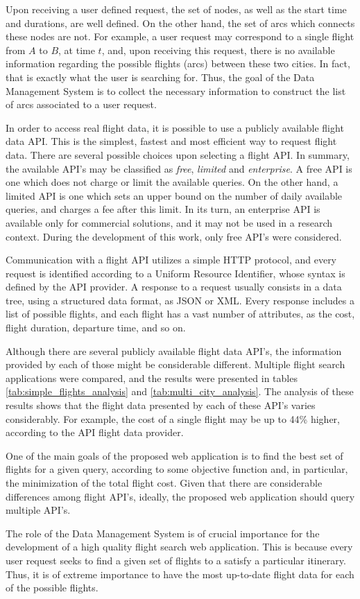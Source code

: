 Upon receiving a user defined request, the set of nodes, as well as the start time and durations, are well defined. On the other hand, the set of arcs which connects these nodes are not. For example, a user request may correspond to a single flight from $A$ to $B$, at time $t$, and, upon receiving this request, there is no available information regarding the possible flights (arcs) between these two cities. In fact, that is exactly what the user is searching for. Thus, the goal of the Data Management System is to collect the necessary information to construct the list of arcs associated to a user request.

In order to access real flight data, it is possible to use a publicly available flight data API. This is the simplest, fastest and most efficient way to request flight data. There are several possible choices upon selecting a flight API. In summary, the available API's may be classified as \textit{free}, \textit{limited} and \textit{enterprise}. A free API is one which does not charge or limit the available queries. On the other hand, a limited API is one which sets an upper bound on the number of daily available queries, and charges a fee after this limit. In its turn, an enterprise API is available  only for commercial solutions, and it may not be used in a research context. During the development of this work, only free API's were considered. 

Communication with a flight API utilizes a simple HTTP protocol, and every request is identified according to a Uniform Resource Identifier, whose syntax is defined by the API provider. A response to a request usually consists in a data tree, using a structured data format, as JSON or XML. Every response includes a list of possible flights, and each flight has a vast number of attributes, as the cost, flight duration, departure time, and so on.

Although there are several publicly available flight data API's, the information provided by each of those might be considerable different. Multiple flight search applications were compared, and the results were presented in tables \ref{tab:simple_flights_analysis} and \ref{tab:multi_city_analysis}. The analysis of these results shows that the flight data presented by each of these API's varies considerably. For example, the cost of a single flight may be up to 44\% higher, according to the API flight data provider. 

One of the main goals of the proposed web application is to find the best set of flights for a given query, according to some objective function and, in particular, the minimization of the total flight cost. Given that there are considerable differences among flight API's, ideally, the proposed web application should query multiple API's.

The role of the Data Management System is of crucial importance for the development of a high quality flight search web application. This is because every user request seeks to find a given set of flights to a satisfy a particular itinerary. Thus, it is of extreme importance to have the most up-to-date flight data for each of the possible flights.  

